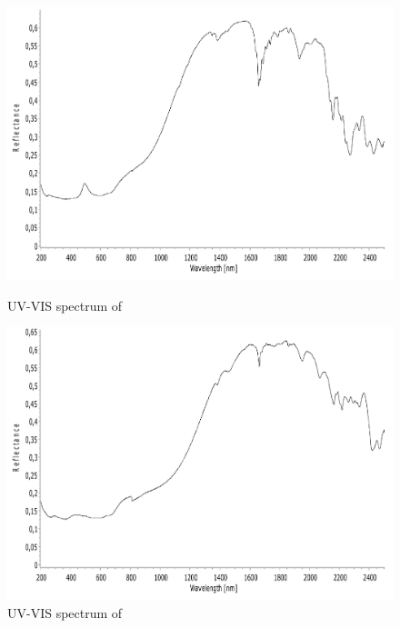 \begin{figure}[!htpb]
\centering
\includegraphics[scale=0.43]{figures/CuR4MOP-VIS.pdf}
\caption*{UV-VIS spectrum of }
\label{fig:CuR4MOP_vis}
\includegraphics[scale=0.43]{figures/CuA4HOMP-VIS.pdf}
\caption*{UV-VIS spectrum of }
\label{fig:CuA4HOMP_vis}
\end{figure}

